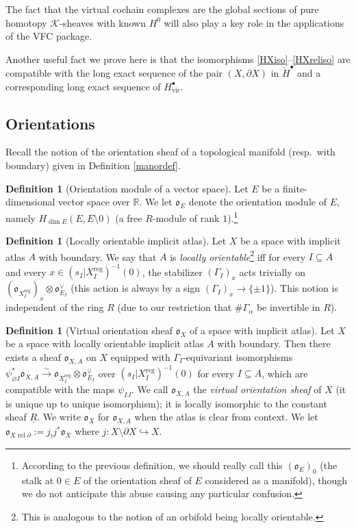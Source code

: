 \documentclass[12pt]{article}
\theoremstyle{definition}
\newtheorem{definition}[theorem]{Definition}
\theoremstyle{remark}
\numberwithin{equation}{subsection}
\newcommand{\K}{\mathcal K}
\newcommand{\oo}{\mathfrak o}
\newcommand{\RR}{\mathbb R}
\newcommand{\cH}{\check H}
\newcommand{\vir}{\mathrm{vir}}
\newcommand{\reg}{\mathrm{reg}}
\newcommand{\rel}{\operatorname{rel}}
\begin{document}
The fact that the virtual cochain complexes are the global sections of pure homotopy $\K$-sheaves with known $H^0$ will also play a key role in the applications of the VFC package.

Another useful fact we prove here is that the isomorphisms \eqref{HXiso}--\eqref{HXreliso} are compatible with the long exact sequence of the pair $(X,\partial X)$ in $\cH^\bullet$ and a corresponding long exact sequence of $H^\bullet_\vir$.

\subsection{Orientations}\label{virtorsheaf}

Recall the notion of the orientation sheaf of a topological manifold (resp.\ with boundary) given in Definition \ref{manordef}.

\begin{definition}[Orientation module of a vector space]
Let $E$ be a finite-dimensional vector space over $\RR$.  We let $\oo_E$ denote the orientation module of $E$, namely $H_{\dim E}(E,E\setminus 0)$ (a free $R$-module of rank $1$).\footnote{According to the previous definition, we should really call this $(\oo_E)_0$ (the stalk at $0\in E$ of the orientation sheaf of $E$ considered as a manifold), though we do not anticipate this abuse causing any particular confusion.}
\end{definition}

\begin{definition}[Locally orientable implicit atlas]\label{IAlocalorient}
Let $X$ be a space with implicit atlas $A$ with boundary.  We say that $A$ is \emph{locally orientable}\footnote{This is analogous to the notion of an orbifold being locally orientable.} iff for every $I\subseteq A$ and every $x\in(s_I|X_I^\reg)^{-1}(0)$, the stabilizer $(\Gamma_I)_x$ acts trivially on $(\oo_{X_I^\reg})_x\otimes\oo_{E_I}^\vee$ (this action is always by a sign $(\Gamma_I)_x\to\{\pm 1\}$).  This notion is independent of the ring $R$ (due to our restriction that $\#\Gamma_\alpha$ be invertible in $R$).
\end{definition}

\begin{definition}[Virtual orientation sheaf $\oo_X$ of a space with implicit atlas]\label{IAorientationsheaf}
Let $X$ be a space with locally orientable implicit atlas $A$ with boundary.  Then there exists a sheaf $\oo_{X,A}$ on $X$ equipped with $\Gamma_I$-equivariant isomorphisms $\psi_{\varnothing I}^\ast\oo_{X,A}\xrightarrow\sim\oo_{X_I^\reg}\otimes\oo_{E_I}^\vee$ over $(s_I|X_I^\reg)^{-1}(0)$ for every $I\subseteq A$, which are compatible with the maps $\psi_{IJ}$.  We call $\oo_{X,A}$ the \emph{virtual orientation sheaf} of $X$ (it is unique up to unique isomorphism); it is locally isomorphic to the constant sheaf $\underline R$.  We write $\oo_X$ for $\oo_{X,A}$ when the atlas is clear from context.  We let $\oo_{X\rel\partial}:=j_!j^\ast\oo_X$ where $j:X\setminus\partial X\hookrightarrow X$.
\end{definition}
\end{document}
